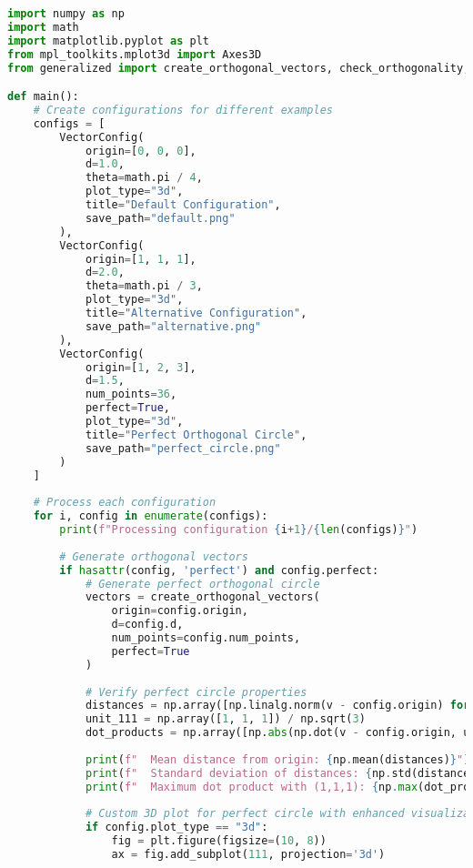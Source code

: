 \begin{lstlisting}[language=Python]
import numpy as np
import math
import matplotlib.pyplot as plt
from mpl_toolkits.mplot3d import Axes3D
from generalized import create_orthogonal_vectors, check_orthogonality, plot_vectors, VectorConfig

def main():
    # Create configurations for different examples
    configs = [
        VectorConfig(
            origin=[0, 0, 0],
            d=1.0,
            theta=math.pi / 4,
            plot_type="3d",
            title="Default Configuration",
            save_path="default.png"
        ),
        VectorConfig(
            origin=[1, 1, 1],
            d=2.0,
            theta=math.pi / 3,
            plot_type="3d",
            title="Alternative Configuration",
            save_path="alternative.png"
        ),
        VectorConfig(
            origin=[1, 2, 3],
            d=1.5,
            num_points=36,
            perfect=True,
            plot_type="3d",
            title="Perfect Orthogonal Circle",
            save_path="perfect_circle.png"
        )
    ]
    
    # Process each configuration
    for i, config in enumerate(configs):
        print(f"Processing configuration {i+1}/{len(configs)}")
        
        # Generate orthogonal vectors
        if hasattr(config, 'perfect') and config.perfect:
            # Generate perfect orthogonal circle
            vectors = create_orthogonal_vectors(
                origin=config.origin,
                d=config.d,
                num_points=config.num_points,
                perfect=True
            )
            
            # Verify perfect circle properties
            distances = np.array([np.linalg.norm(v - config.origin) for v in vectors])
            unit_111 = np.array([1, 1, 1]) / np.sqrt(3)
            dot_products = np.array([np.abs(np.dot(v - config.origin, unit_111)) for v in vectors])
            
            print(f"  Mean distance from origin: {np.mean(distances)}")
            print(f"  Standard deviation of distances: {np.std(distances)}")
            print(f"  Maximum dot product with (1,1,1): {np.max(dot_products)}")
            
            # Custom 3D plot for perfect circle with enhanced visualization
            if config.plot_type == "3d":
                fig = plt.figure(figsize=(10, 8))
                ax = fig.add_subplot(111, projection='3d')
                

\end{lstlisting}
